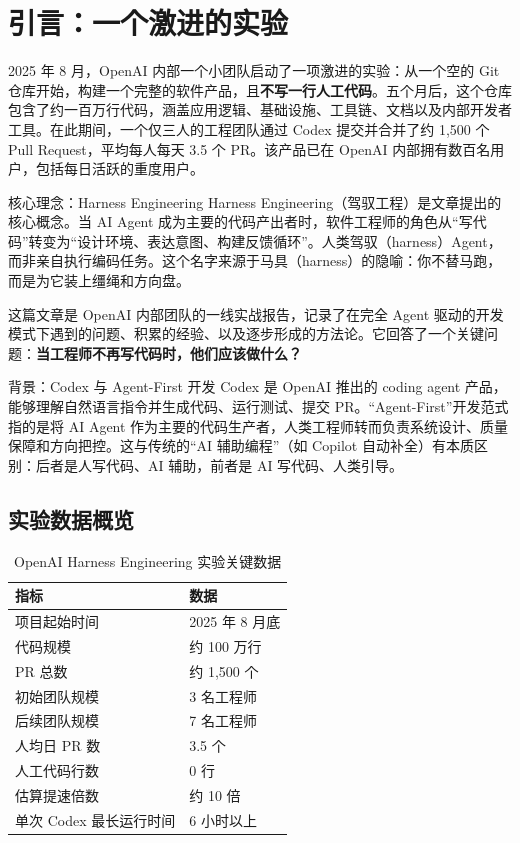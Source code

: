 \section{引言：一个激进的实验}

2025 年 8 月，OpenAI 内部一个小团队启动了一项激进的实验：从一个空的 Git 仓库开始，构建一个完整的软件产品，且\textbf{不写一行人工代码}。五个月后，这个仓库包含了约一百万行代码，涵盖应用逻辑、基础设施、工具链、文档以及内部开发者工具。在此期间，一个仅三人的工程团队通过 Codex 提交并合并了约 1,500 个 Pull Request，平均每人每天 3.5 个 PR。该产品已在 OpenAI 内部拥有数百名用户，包括每日活跃的重度用户。

\begin{importantbox}{核心理念：Harness Engineering}
Harness Engineering（驾驭工程）是文章提出的核心概念。当 AI Agent 成为主要的代码产出者时，软件工程师的角色从``写代码''转变为``设计环境、表达意图、构建反馈循环''。人类驾驭（harness）Agent，而非亲自执行编码任务。这个名字来源于马具（harness）的隐喻：你不替马跑，而是为它装上缰绳和方向盘。
\end{importantbox}

这篇文章是 OpenAI 内部团队的一线实战报告，记录了在完全 Agent 驱动的开发模式下遇到的问题、积累的经验、以及逐步形成的方法论。它回答了一个关键问题：\textbf{当工程师不再写代码时，他们应该做什么？}

\begin{knowledgebox}{背景：Codex 与 Agent-First 开发}
Codex 是 OpenAI 推出的 coding agent 产品，能够理解自然语言指令并生成代码、运行测试、提交 PR。``Agent-First''开发范式指的是将 AI Agent 作为主要的代码生产者，人类工程师转而负责系统设计、质量保障和方向把控。这与传统的``AI 辅助编程''（如 Copilot 自动补全）有本质区别：后者是人写代码、AI 辅助，前者是 AI 写代码、人类引导。
\end{knowledgebox}

\subsection{实验数据概览}

\begin{table}[H]
\centering
\begin{tabular}{ll}
\toprule
\textbf{指标} & \textbf{数据} \\
\midrule
项目起始时间 & 2025 年 8 月底 \\
代码规模 & 约 100 万行 \\
PR 总数 & 约 1,500 个 \\
初始团队规模 & 3 名工程师 \\
后续团队规模 & 7 名工程师 \\
人均日 PR 数 & 3.5 个 \\
人工代码行数 & 0 行 \\
估算提速倍数 & 约 10 倍 \\
单次 Codex 最长运行时间 & 6 小时以上 \\
\bottomrule
\end{tabular}
\caption{OpenAI Harness Engineering 实验关键数据}
\end{table}

